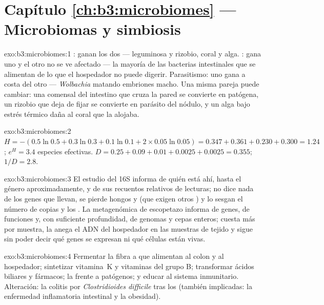 \section*{Capítulo \ref{ch:b3:microbiomes} --- Microbiomas y simbiosis}

\begin{solution}{exo:b3:microbiomes:1}
: ganan los dos --- leguminosa y rizobio, coral y alga.
: gana uno y el otro no se ve afectado --- la mayoría de las
bacterias intestinales que se alimentan de lo que el hospedador no puede
digerir. Parasitismo: uno gana a costa del otro --- \emph{Wolbachia}
matando embriones macho. Una misma pareja puede cambiar: una comensal del
intestino que cruza la pared se convierte en patógena, un rizobio que
deja de fijar se convierte en parásito del nódulo, y un alga bajo estrés
térmico daña al coral que la alojaba.
\end{solution}

\begin{solution}{exo:b3:microbiomes:2}
$H = -(0.5\ln 0.5 + 0.3\ln 0.3 + 0.1\ln 0.1 + 2\times 0.05\ln 0.05) =
0.347 + 0.361 + 0.230 + 0.300 = 1.24$; $e^{H} = 3.4$ especies efectivas.
$D = 0.25 + 0.09 + 0.01 + 0.0025 + 0.0025 = 0.355$; $1/D =
2.8$.
\end{solution}

\begin{solution}{exo:b3:microbiomes:3}
El estudio del 16S informa de quién está ahí, hasta el género
aproximadamente, y de sus recuentos relativos de lecturas; no dice nada
de los genes que llevan, se pierde hongos y  (que exigen otros
) y lo sesgan el número de copias y los . La
metagenómica de escopetazo informa de genes, de funciones y, con
suficiente profundidad, de genomas y cepas enteros; cuesta más por
muestra, la anega el ADN del hospedador en las muestras de tejido y sigue
sin poder decir qué genes se expresan ni qué células están vivas.
\end{solution}

\begin{solution}{exo:b3:microbiomes:4}
Fermentar la fibra a  que alimentan al colon
y al hospedador; sintetizar vitamina~K y vitaminas del grupo B;
transformar ácidos biliares y fármacos; la 
frente a patógenos; y educar al sistema inmunitario. Alteración: la
colitis por \emph{Clostridioides difficile} tras los 
(también implicadas: la enfermedad inflamatoria intestinal y la
obesidad).
\end{solution}

